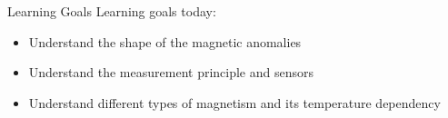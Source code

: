 \begin{frame}
  \begin{PointSix}{Learning Goals}
    \alert{Learning goals today:}
    \begin{itemize}
      \item Understand the shape of the magnetic anomalies
      \item Understand the measurement principle and sensors
      \item Understand different types of magnetism and its temperature dependency
    \end{itemize}
  \end{PointSix}
\end{frame}

